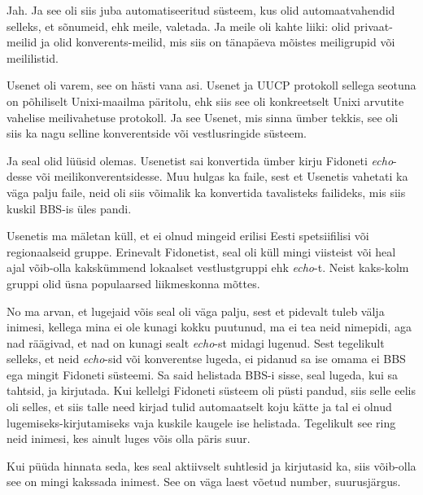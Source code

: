 Jah. Ja see oli siis juba automatiseeritud süsteem, kus olid automaatvahendid 
selleks, et sõnumeid, ehk  meile, valetada. Ja meile oli kahte liiki: olid 
privaat-meilid ja olid konverents-meilid, mis siis on tänapäeva mõistes 
meiligrupid või meililistid.


Usenet oli varem, see on hästi vana asi. Usenet ja UUCP protokoll sellega 
seotuna on põhiliselt  Unixi-maailma päritolu, ehk siis see oli konkreetselt 
Unixi arvutite vahelise meilivahetuse protokoll. Ja see Usenet, mis  sinna 
ümber tekkis,  see oli siis ka nagu selline konverentside või vestlusringide 
süsteem.


Ja seal olid lüüsid olemas. Usenetist sai konvertida ümber kirju Fidoneti 
\emph{echo}-desse või meilikonverentsidesse. Muu hulgas ka faile, sest et 
Usenetis vahetati ka väga palju faile,  neid oli siis võimalik ka konvertida 
tavalisteks failideks, mis siis kuskil BBS-is üles pandi.


Usenetis ma mäletan küll, et ei olnud mingeid erilisi Eesti spetsiifilisi või 
regionaalseid gruppe. Erinevalt Fidonetist, seal oli küll mingi viisteist või 
heal ajal võib-olla kakskümmend lokaalset  vestlustgruppi ehk \emph{echo}-t. 
Neist kaks-kolm gruppi olid üsna populaarsed liikmeskonna mõttes.


No ma arvan, et lugejaid võis seal oli väga palju, sest et pidevalt tuleb välja 
inimesi, kellega mina ei ole kunagi kokku puutunud, ma ei tea neid nimepidi, 
aga nad räägivad, et nad on kunagi sealt \emph{echo}-st  midagi lugenud. Sest 
tegelikult selleks, et neid \emph{echo}-sid või konverentse lugeda,  ei pidanud 
sa ise omama ei BBS ega mingit Fidoneti süsteemi. Sa said helistada BBS-i 
sisse, seal lugeda, kui sa tahtsid, ja kirjutada. Kui kellelgi Fidoneti süsteem 
oli püsti pandud, siis selle eelis oli selles, et siis talle need kirjad tulid 
automaatselt koju kätte ja tal ei olnud lugemiseks-kirjutamiseks vaja kuskile 
kaugele ise helistada. Tegelikult see ring  neid inimesi, kes  ainult luges 
võis olla päris suur. 

Kui püüda hinnata seda, kes seal aktiivselt suhtlesid ja kirjutasid ka, siis  
võib-olla see on mingi kakssada inimest. See on väga laest võetud number, 
suurusjärgus.

